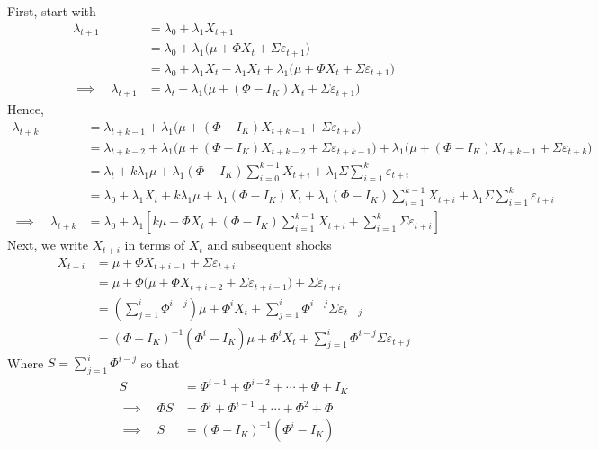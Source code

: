 \documentclass[12pt]{article}
\theoremstyle{plain}
\theoremstyle{definition}
\theoremstyle{remark}
\begin{document}
\clearpage
First, start with
\begin{align*}
  \lambda_{t+1}
  &= \lambda_0 + \lambda_1 X_{t+1} \\
  &= \lambda_0 + \lambda_1\big(\mu+\Phi X_t+\Sigma\varepsilon_{t+1}\big)  \\
  &= \lambda_0 + \lambda_1 X_t - \lambda_1 X_t + \lambda_1\big(\mu+\Phi X_t+\Sigma\varepsilon_{t+1}\big)  \\
  \implies\quad
  \lambda_{t+1}
  &= \lambda_t
  + \lambda_1\big(\mu+(\Phi - I_K) X_t+\Sigma\varepsilon_{t+1}\big)
\end{align*}
Hence,
\begin{align*}
  \lambda_{t+k}
  &= \lambda_{t+k-1}
  + \lambda_1\big(\mu+(\Phi - I_K) X_{t+k-1}+\Sigma\varepsilon_{t+k}\big)
  \\
  &=
  \lambda_{t+k-2}
  + \lambda_1\big(\mu+(\Phi - I_K) X_{t+k-2}+\Sigma\varepsilon_{t+k-1}\big)
  + \lambda_1\big(\mu+(\Phi - I_K) X_{t+k-1}+\Sigma\varepsilon_{t+k}\big)
  \\
  &=
  \lambda_{t}
  + k \lambda_1 \mu
  + \lambda_1(\Phi-I_K)
  \sum_{i=0}^{k-1} X_{t+i}
  + \lambda_1\Sigma \sum_{i=1}^k \varepsilon_{t+i}
  \\
  &=
  \lambda_{0} + \lambda_1 X_t
  + k \lambda_1 \mu
  + \lambda_1(\Phi-I_K)X_t
  + \lambda_1(\Phi-I_K)
  \sum_{i=1}^{k-1} X_{t+i}
  + \lambda_1\Sigma \sum_{i=1}^k \varepsilon_{t+i}
  \\
  \implies\quad
  \lambda_{t+k}
  &=
  \lambda_{0}
  + \lambda_1
  \left[
  k \mu
  + \Phi X_t
  + (\Phi-I_K)
  \sum_{i=1}^{k-1} X_{t+i}
  + \sum_{i=1}^k \Sigma \varepsilon_{t+i}
  \right]
\end{align*}
Next, we write $X_{t+i}$ in terms of $X_t$ and subsequent shocks
\begin{align*}
  X_{t+i}
  &=
  \mu + \Phi X_{t+i-1}
  + \Sigma \varepsilon_{t+i}
  \\
  &=
  \mu + \Phi
  \big(
  \mu + \Phi X_{t+i-2}
  + \Sigma \varepsilon_{t+i-1}
  \big)
  + \Sigma \varepsilon_{t+i}
  \\
  &=
  \left(
  \sum_{j=1}^i \Phi^{i-j}
  \right)
  \mu
  +
  \Phi^i X_t
  +
  \sum_{j=1}^i \Phi^{i-j}\Sigma\varepsilon_{t+j}
  \\
  &=
  (\Phi - I_K)^{-1}(\Phi^i - I_K)
  \mu
  +
  \Phi^i X_t
  +
  \sum_{j=1}^i \Phi^{i-j}\Sigma\varepsilon_{t+j}
\end{align*}
Where $S = \sum_{j=1}^i \Phi^{i-j}$ so that
\begin{align*}
  S
  &= \Phi^{i-1} + \Phi^{i-2} + \cdots + \Phi + I_K
  \\
  \implies\quad
  \Phi S &=
  \Phi^{i} + \Phi^{i-1} + \cdots + \Phi^2 + \Phi
  \\
  \implies\quad
   S &=
  (\Phi - I_K)^{-1}(\Phi^i - I_K)
\end{align*}
\end{document}
